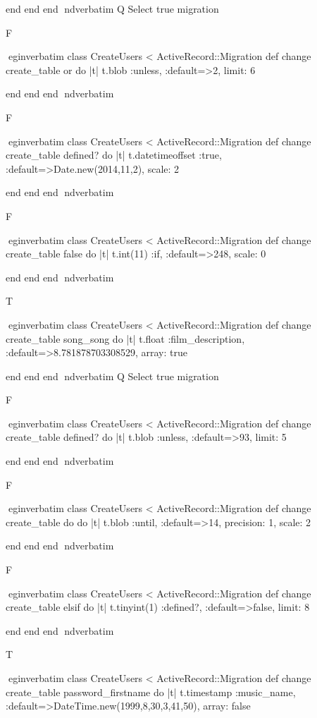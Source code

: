     end 
  end 
end
nd{verbatim}
Q
 Select true migration

F

egin{verbatim}
 class CreateUsers < ActiveRecord::Migration 
  def change 
    create_table or do |t| 
      t.blob :unless, :default=>2, limit: 6
    
    end 
  end 
end
nd{verbatim}

F

egin{verbatim}
 class CreateUsers < ActiveRecord::Migration 
  def change 
    create_table defined? do |t| 
      t.datetimeoffset :true, :default=>Date.new(2014,11,2), scale: 2
    
    end 
  end 
end
nd{verbatim}

F

egin{verbatim}
 class CreateUsers < ActiveRecord::Migration 
  def change 
    create_table false do |t| 
      t.int(11) :if, :default=>248, scale: 0
    
    end 
  end 
end
nd{verbatim}

T

egin{verbatim}
 class CreateUsers < ActiveRecord::Migration 
  def change 
    create_table song_song do |t| 
      t.float :film_description, :default=>8.781878703308529, array: true
    
    end 
  end 
end
nd{verbatim}
Q
 Select true migration

F

egin{verbatim}
 class CreateUsers < ActiveRecord::Migration 
  def change 
    create_table defined? do |t| 
      t.blob :unless, :default=>93, limit: 5
    
    end 
  end 
end
nd{verbatim}

F

egin{verbatim}
 class CreateUsers < ActiveRecord::Migration 
  def change 
    create_table do do |t| 
      t.blob :until, :default=>14, precision: 1, scale: 2
    
    end 
  end 
end
nd{verbatim}

F

egin{verbatim}
 class CreateUsers < ActiveRecord::Migration 
  def change 
    create_table elsif do |t| 
      t.tinyint(1) :defined?, :default=>false, limit: 8
    
    end 
  end 
end
nd{verbatim}

T

egin{verbatim}
 class CreateUsers < ActiveRecord::Migration 
  def change 
    create_table password_firstname do |t| 
      t.timestamp :music_name, :default=>DateTime.new(1999,8,30,3,41,50), array: false
    

